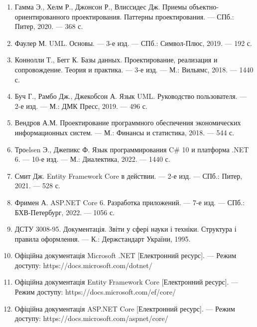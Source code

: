 \documentclass[14pt,a4paper]{extarticle}
\begin{document}
\begin{enumerate}
    \item Гамма Э., Хелм Р., Джонсон Р., Влиссидес Дж. Приемы объектно-ориентированного проектирования. Паттерны проектирования. --- СПб.: Питер, 2020. --- 368 с.
    
    \item Фаулер М. UML. Основы. --- 3-е изд. --- СПб.: Символ-Плюс, 2019. --- 192 с.
    
    \item Коннолли Т., Бегг К. Базы данных. Проектирование, реализация и сопровождение. Теория и практика. --- 3-е изд. --- М.: Вильямс, 2018. --- 1440 с.
    
    \item Буч Г., Рамбо Дж., Джекобсон А. Язык UML. Руководство пользователя. --- 2-е изд. --- М.: ДМК Пресс, 2019. --- 496 с.
    
    \item Вендров А.М. Проектирование программного обеспечения экономических информационных систем. --- М.: Финансы и статистика, 2018. --- 544 с.
    
    \item Троelsen Э., Джепикс Ф. Язык программирования C\# 10 и платформа .NET 6. --- 10-е изд. --- М.: Диалектика, 2022. --- 1440 с.
    
    \item Смит Дж. Entity Framework Core в действии. --- 2-е изд. --- СПб.: Питер, 2021. --- 528 с.
    
    \item Фримен А. ASP.NET Core 6. Разработка приложений. --- 7-е изд. --- СПб.: БХВ-Петербург, 2022. --- 1056 с.
    
    \item ДСТУ 3008-95. Документація. Звіти у сфері науки і техніки. Структура і правила оформлення. --- К.: Держстандарт України, 1995.
    
    \item Офіційна документація Microsoft .NET [Електронний ресурс]. --- Режим доступу: https://docs.microsoft.com/dotnet/
    
    \item Офіційна документація Entity Framework Core [Електронний ресурс]. --- Режим доступу: https://docs.microsoft.com/ef/core/
    
    \item Офіційна документація ASP.NET Core [Електронний ресурс]. --- Режим доступу: https://docs.microsoft.com/aspnet/core/
    

\end{enumerate}
\end{document}
